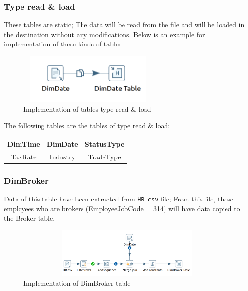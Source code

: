 \documentclass{article}
\newcommand\pcw[1]{\texttt{#1}}
\begin{document}
\subsubsection{Type read \& load}
These tables are static; The data will be read from the file and will be loaded in the destination without any modifications. Below is an example for implementation of these kinds of table:
\begin{figure}[H] 
\begin{center}
\includegraphics[width=7cm, height=2.5cm]{images2/TypeA2.png}
\end{center}
\caption{Implementation of tables type read \& load}
\label{readload}
\end{figure} 
The following tables are the tables of type read \& load:
\begin{table}[H]
\begin{center}
\begin{tabular}{|c|c|c|}
\hline
DimTime & DimDate  & StatusType \\ \hline
TaxRate & Industry & TradeType  \\ \hline
\end{tabular}
\end{center}
\end{table}

\subsubsection{DimBroker}
Data of this table have been extracted from \pcw{HR.csv} file; From this file, those employees who are brokers (EmployeeJobCode = 314) will have data copied to the Broker table.
\begin{figure}[H] 
\begin{center}
\includegraphics[width=15cm, height=2.5cm]{images2/DimBroker.png}
\end{center}
\caption{Implementation of DimBroker table}
\label{DimBroker}
\end{figure} 
\end{document}
